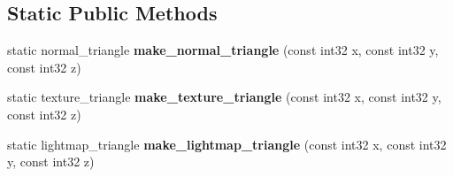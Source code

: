 \subsection*{Static Public Methods}
\begin{DoxyCompactItemize}
\item 
\mbox{\label{class_mesh_storage_a8b3a51cebf14fe1b3e852c04be1c03e2}} 
static normal\+\_\+triangle {\bfseries make\+\_\+normal\+\_\+triangle} (const int32 x, const int32 y, const int32 z)
\item 
\mbox{\label{class_mesh_storage_abf200c9ddb32cd972865fbc94dc44a75}} 
static texture\+\_\+triangle {\bfseries make\+\_\+texture\+\_\+triangle} (const int32 x, const int32 y, const int32 z)
\item 
\mbox{\label{class_mesh_storage_a7fd484d69f35f79c2e1f8920df57b335}} 
static lightmap\+\_\+triangle {\bfseries make\+\_\+lightmap\+\_\+triangle} (const int32 x, const int32 y, const int32 z)
\end{DoxyCompactItemize}

